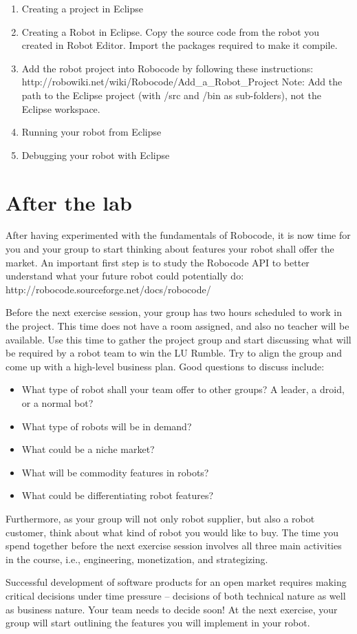 \documentclass{scrreprt}
\begin{document}
\begin{enumerate}
\item Creating a project in Eclipse
\item Creating a Robot in Eclipse. Copy the source code from the robot you created in Robot Editor. Import the packages required to make it compile.
\item Add the robot project into Robocode by following these instructions:\\http://robowiki.net/wiki/Robocode/Add\_a\_Robot\_Project Note: Add the path to the Eclipse project (with /src and /bin as sub-folders), not the Eclipse workspace.
\item Running your robot from Eclipse
\item Debugging your robot with Eclipse
\end{enumerate}

\chapter{After the lab}
After having experimented with the fundamentals of Robocode, it is now time for you and your group to start thinking about features your robot shall offer the market. An important first step is to study the Robocode API to better understand what your future robot could potentially do: http://robocode.sourceforge.net/docs/robocode/

Before the next exercise session, your group has two hours scheduled to work in the project. This time does not have a room assigned, and also no teacher will be available. Use this time to gather the project group and start discussing what will be required by a robot team to win the LU Rumble. Try to align the group and come up with a high-level business plan. Good questions to discuss include:
\begin{itemize}
\item What type of robot shall your team offer to other groups? A leader, a droid, or a normal bot?
\item What type of robots will be in demand?
\item What could be a niche market?
\item What will be commodity features in robots?
\item What could be differentiating robot features?
\end{itemize}

Furthermore, as your group will not only robot supplier, but also a robot customer, think about what kind of robot you would like to buy. The time you spend together before the next exercise session involves all three main activities in the course, i.e., engineering, monetization, and strategizing.  

Successful development of software products for an open market requires making critical decisions under time pressure -- decisions of both technical nature as well as business nature. Your team needs to decide soon! At the next exercise, your group will start outlining the features you will implement in your robot.
\end{document}
